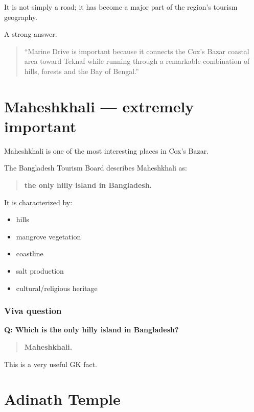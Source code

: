 It is not simply a road; it has become a major part of the region's tourism geography.

A strong answer:

\begin{quote}
``Marine Drive is important because it connects the Cox's Bazar coastal area toward Teknaf while running through a remarkable combination of hills, forests and the Bay of Bengal.''\\
\end{quote}

\medskip

\section{Maheshkhali --- extremely important}

Maheshkhali is one of the most interesting places in Cox's Bazar.

The Bangladesh Tourism Board describes Maheshkhali as:

\begin{quote}
\textbf{the only hilly island in Bangladesh.}\\
\end{quote}

It is characterized by:

\begin{itemize}
  \item hills
  \item mangrove vegetation
  \item coastline
  \item salt production
  \item cultural/religious heritage
\end{itemize}



\subsubsection{Viva question}

\textbf{Q: Which is the only hilly island in Bangladesh?}

\begin{quote}
\textbf{Maheshkhali.}\\
\end{quote}

This is a very useful GK fact.

\medskip

\section{Adinath Temple}

